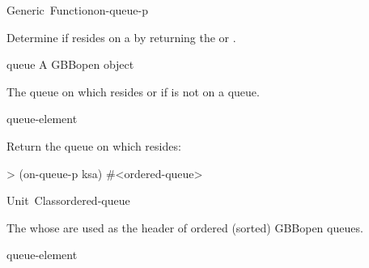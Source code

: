 \documentclass[10pt,twoside,english,pdftex]{article}
\begin{document}
\begin{functiondoc}{Generic~Function}{on-queue-p}{ 
    \returns{} }
%
%

\fnsyntax

\fnpurpose Determine if  resides on a
  by returning the  or \nil.

\fnmethods
{}

\fnpackage {}

\fnmodule {}

\fnargs
\begin{args}{queue}
 A GBBopen  object
\end{args}

\fnreturns The  queue on which 
resides or \nil{} if  is not on a queue.
  
\begin{alsos}{queue-element}
\end{alsos}

\fnexample
Return the queue on which  resides:
%
\W\supp
\begin{example}
> (on-queue-p ksa)
#<ordered-queue>
\end{example}

\end{functiondoc}


\begin{functiondoc}{Unit~Class}{ordered-queue}{}
%
%

\fnsyntax

\fnpackage {}

\fnmodule {}

\fndescription The  whose  are used 
as the header of ordered (sorted) GBBopen queues.

\begin{alsos}{queue-element}
\also[queue]
\end{alsos}

\end{functiondoc}
\end{document}
